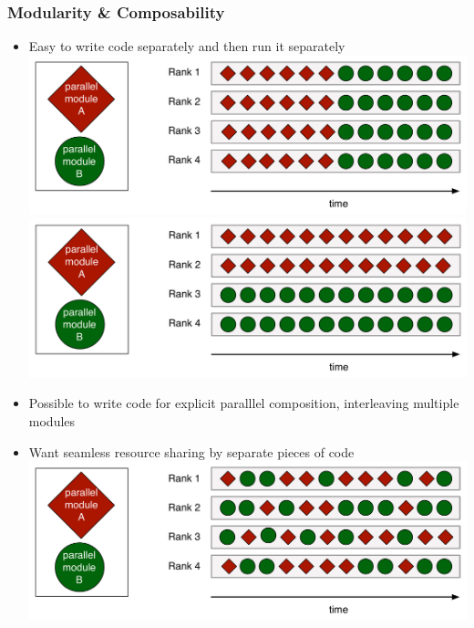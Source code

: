 \begin{frame}
\frametitle{Modularity \& Composability}
\begin{itemize}
\item Easy to write code separately and then run it separately
\includegraphics[width=.45\textwidth]{../figures/timeDivision.pdf}
\includegraphics[width=.45\textwidth]{../figures/spaceDivision.pdf}
\item Possible to write code for explicit paralllel composition, interleaving multiple modules
\item Want seamless resource sharing by separate pieces of code
\includegraphics[width=.7\textwidth]{../figures/composition.pdf}
\end{itemize}
\end{frame}

